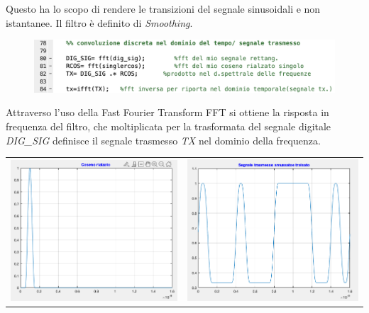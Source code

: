 \documentclass[12pt, a4paper]{article}
\begin{document}
Questo ha lo scopo di rendere le transizioni del segnale sinusoidali e non istantanee. 
Il filtro è definito di \textit{Smoothing}.

\begin{figure}[h!]
\centering
\includegraphics[scale=0.4]{convoluzionediscreta.png}
\caption{}
\label{}
\end{figure}

Attraverso l'uso della Fast Fourier Transform FFT si ottiene la risposta in frequenza del filtro, che moltiplicata per la trasformata del segnale digitale \textit{DIG\_SIG} definisce il segnale trasmesso \textit{TX} nel dominio della frequenza.

\vspace{5mm}
\begin{center}
\begin{tabular}{c c}
\includegraphics[scale = 0.7]{cosrialzatoimg.png}
&
\includegraphics[scale = 0.7]{segnalesmussato.png}
\end{tabular}
\end{center}




\end{document}
